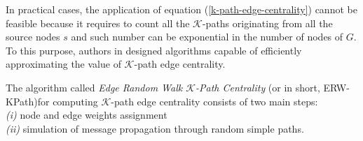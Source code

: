 In practical cases, the application of equation (\ref{k-path-edge-centrality}) cannot be feasible because it requires to count all the $\mathcal{K}$-paths originating from all the source nodes $s$ and such number can be exponential in the number of nodes of $G$. To this purpose, authors in \cite{ref-35} designed algorithms capable of efficiently approximating the value of $\mathcal{K}$-path edge centrality.

The algorithm called \textit{Edge Random Walk $\mathcal{K}$-Path Centrality} (or in short, ERW-KPath)for computing $\mathcal{K}$-path edge centrality consists of two main steps:\\ \textit{(i)} node and edge weights assignment\\ 
\textit{(ii)} simulation of message propagation through random simple paths.

